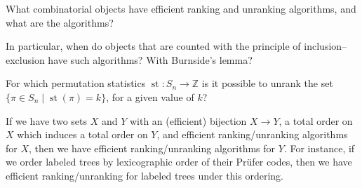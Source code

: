 \documentclass{article}
\begin{document}
\begin{question}
  What combinatorial objects have efficient ranking and unranking algorithms,
  and what are the algorithms?
\end{question}

\begin{related}
  \item In particular, when do objects that are counted with the principle of
  inclusion--exclusion have such algorithms? With Burnside's lemma?
  \item For which permutation statistics
  $\operatorname{st}\colon S_n \to \mathbb Z$
  is it possible to unrank the set
  $\{\pi \in S_n \mid \operatorname{st}(\pi) = k\}$, for a given value of $k$?
\end{related}

\begin{note}
  If we have two sets $X$ and $Y$ with an (efficient) bijection $X \to Y$, a
  total order on $X$ which induces a total order on $Y$,
  and efficient ranking/unranking algorithms for $X$,
  then we have efficient ranking/unranking algorithms for $Y$.
  For instance, if we order labeled trees
  by lexicographic order of their Pr\"ufer codes, then we have efficient
  ranking/unranking for labeled trees under this ordering.
\end{note}
\end{document}
